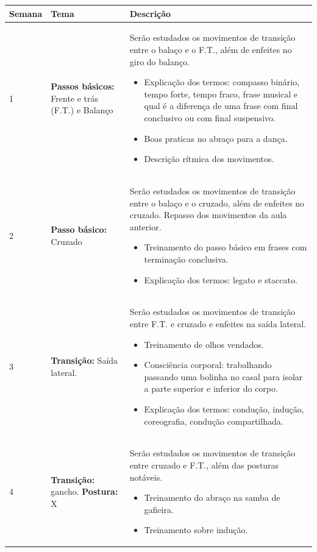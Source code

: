 \documentclass{article}
\begin{document}
\begin{table}[h]
\centering
\begin{tabular}{|p{1.5cm}|p{5cm}|p{9cm}|}
\hline
Semana & Tema & Descrição \\  \hline \hline
1 &  \textbf{Passos básicos:} Frente e trás (F.T.) e Balanço & Serão estudados os movimentos de transição entre o balaço e o F.T., além de enfeites no giro do balanço. 
        \begin{itemize}
        \item Explicação dos termos: compasso binário, tempo forte, tempo fraco, frase musical e qual é a diferença de uma frase com final conclusivo ou com final suspensivo.
        \item Boas praticas no abraço para a dança. 
        \item Descrição rítmica dos movimentos.
        \end{itemize}
        \\ \hline
2 &  \textbf{Passo básico:} Cruzado &  Serão estudados os movimentos de transição entre o balaço e o cruzado, além de enfeites no cruzado. Repasso dos movimentos da aula anterior. 
        \begin{itemize}
        \item Treinamento do passo básico em frases com terminação conclusiva. 
        \item Explicação dos termos: legato e staccato.
        \end{itemize}
        \\ \hline
3 &  \textbf{Transição:} Saída lateral. &  Serão estudados os movimentos de transição entre F.T. e cruzado e enfeites na saída lateral. 
        \begin{itemize}
        \item Treinamento de  olhos vendados.
        \item Consciência corporal: trabalhando passando uma bolinha no casal para isolar a parte superior e inferior do corpo.
        \item Explicação dos termos: condução, indução, coreografia, condução compartilhada.
        \end{itemize}
        \\ \hline
4 &  \textbf{Transição:} gancho. \textbf{Postura:} X &  Serão estudados os movimentos de transição entre cruzado e F.T., além das posturas notáveis.
        \begin{itemize}
        \item Treinamento do abraço na samba de gafieira.
        \item Treinamento sobre indução.

\end{itemize}
\end{tabular}
\end{table}
\end{document}
